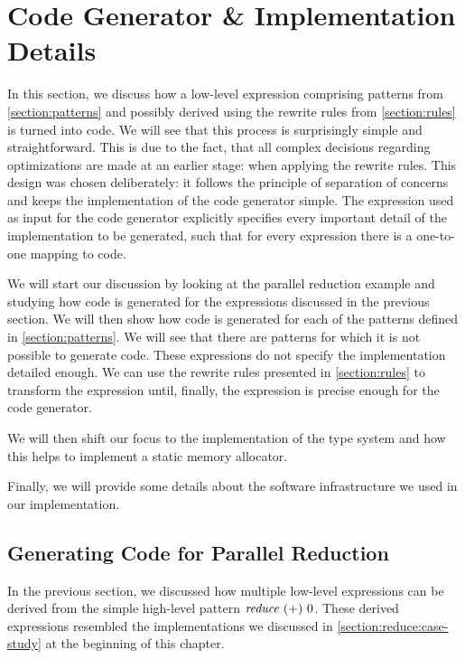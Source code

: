 \section{Code Generator \& Implementation Details}
In this section, we discuss how a low-level expression comprising patterns from \autoref{section:patterns} and possibly derived using the rewrite rules from \autoref{section:rules} is turned into \OpenCL code.
We will see that this process is surprisingly simple and straightforward.
This is due to the fact, that all complex decisions regarding optimizations are made at an earlier stage: when applying the rewrite rules.
This design was chosen deliberately:
it follows the principle of separation of concerns and keeps the implementation of the code generator simple.
The expression used as input for the code generator explicitly specifies every important detail of the \OpenCL implementation to be generated, such that for every expression there is a one-to-one mapping to \OpenCL code.

We will start our discussion by looking at the parallel reduction example and studying how \OpenCL code is generated for the expressions discussed in the previous section.
We will then show how \OpenCL code is generated for each of the patterns defined in \autoref{section:patterns}.
We will see that there are patterns for which it is not possible to generate \OpenCL code.
These expressions do not specify the \OpenCL implementation detailed enough.
We can use the rewrite rules presented in \autoref{section:rules} to transform the expression until, finally, the expression is precise enough for the code generator.

We will then shift our focus to the implementation of the type system and how this helps to implement a static memory allocator.

Finally, we will provide some details about the software infrastructure we used in our implementation.

\subsection{Generating \OpenCL Code for Parallel Reduction}
In the previous section, we discussed how multiple low-level expressions can be derived from the simple high-level pattern $\text{\textit{reduce}}\ (+)\ 0$.
These derived expressions resembled the \OpenCL implementations we discussed in \autoref{section:reduce:case-study} at the beginning of this chapter.

